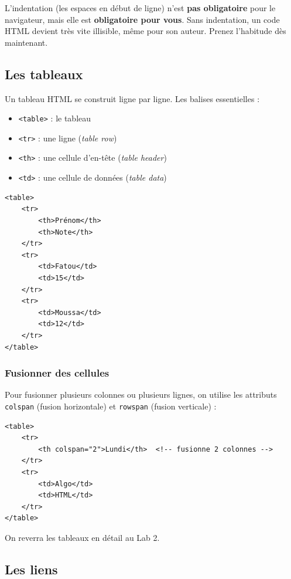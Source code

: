 \documentclass[11pt,a4paper]{article}
\begin{document}
\begin{infobox}[L'indentation]
L'indentation (les espaces en début de ligne) n'est \textbf{pas obligatoire}
pour le navigateur, mais elle est \textbf{obligatoire pour vous}. Sans
indentation, un code HTML devient très vite illisible, même pour son auteur.
Prenez l'habitude dès maintenant.
\end{infobox}

\subsection{Les tableaux}

Un tableau HTML se construit ligne par ligne. Les balises essentielles :

\begin{itemize}[nosep]
    \item \texttt{<table>} : le tableau
    \item \texttt{<tr>} : une ligne (\emph{table row})
    \item \texttt{<th>} : une cellule d'en-tête (\emph{table header})
    \item \texttt{<td>} : une cellule de données (\emph{table data})
\end{itemize}

\begin{lstlisting}[language=HTML5]
<table>
    <tr>
        <th>Prénom</th>
        <th>Note</th>
    </tr>
    <tr>
        <td>Fatou</td>
        <td>15</td>
    </tr>
    <tr>
        <td>Moussa</td>
        <td>12</td>
    </tr>
</table>
\end{lstlisting}

\subsubsection*{Fusionner des cellules}

Pour fusionner plusieurs colonnes ou plusieurs lignes, on utilise les
attributs \texttt{colspan} (fusion horizontale) et \texttt{rowspan} (fusion
verticale) :

\begin{lstlisting}[language=HTML5]
<table>
    <tr>
        <th colspan="2">Lundi</th>  <!-- fusionne 2 colonnes -->
    </tr>
    <tr>
        <td>Algo</td>
        <td>HTML</td>
    </tr>
</table>
\end{lstlisting}

On reverra les tableaux en détail au Lab 2.

\subsection{Les liens}
\end{document}
